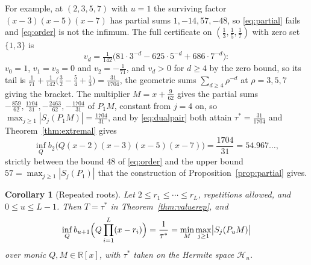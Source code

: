 \documentclass[11pt]{article}
\newtheorem{corollary}[theorem]{Corollary}
\theoremstyle{definition}
\theoremstyle{plain}
\newcommand{\R}{\mathbb R}
\begin{document}
For example, at $(2,3,5,7)$ with $u=1$ the surviving factor
$(x-3)(x-5)(x-7)$ has partial sums $1,-14,57,-48$, so \eqref{eq:partial}
fails and \eqref{eq:order} is not the infimum.  The full certificate on
$(\tfrac13,\tfrac15,\tfrac17)$ with zero set $\{1,3\}$ is
\[
  v_d=\tfrac1{142}\bigl(81\cdot3^{-d}-625\cdot5^{-d}+686\cdot7^{-d}\bigr):
\]
$v_0=1$, $v_1=v_3=0$ and $v_2=-\tfrac1{71}$, and $v_d>0$ for $d\ge4$ by the
zero bound, so its tail is
$\tfrac1{71}+\tfrac1{142}\bigl(\tfrac32-\tfrac54+\tfrac13\bigr)=\tfrac{31}{1704}$,
the geometric sums $\sum_{d\ge4}\rho^{-d}$ at $\rho=3,5,7$ giving the
bracket.  The multiplier $M=x+\tfrac9{62}$ gives the partial sums
$-\tfrac{859}{62},\tfrac{1704}{31},-\tfrac{2463}{62},-\tfrac{1704}{31}$ of
$P_1M$, constant from $j=4$ on, so
$\max_{j\ge1}|S_j(P_1M)|=\tfrac{1704}{31}$, and by \eqref{eq:dualpair} both
attain $\tau^*=\tfrac{31}{1704}$ and Theorem~\ref{thm:extremal} gives
\[
  \inf_Qb_2\bigl(Q(x-2)(x-3)(x-5)(x-7)\bigr)=\frac{1704}{31}=54.967\ldots,
\]
strictly between the bound $48$ of \eqref{eq:order} and the upper bound
$57=\max_{j\ge1}|S_j(P_1)|$ that the construction of
Proposition~\ref{prop:partial} gives.

\begin{corollary}[Repeated roots]\label{cor:extremalrep}
Let $2\le r_1\le\cdots\le r_L$, repetitions allowed, and $0\le u\le L-1$.
Then $T=\tau^*$ in Theorem~\ref{thm:valuerep}, and
\[
  \inf_Qb_{u+1}\Bigl(Q\prod_{i=1}^L(x-r_i)\Bigr)=\frac1{\tau^*}
  =\min_M\max_{j\ge1}\bigl|S_j(P_uM)\bigr|
\]
over monic $Q,M\in\R[x]$, with $\tau^*$ taken on the Hermite space
$\mathcal H_u$.
\end{corollary}
\end{document}
